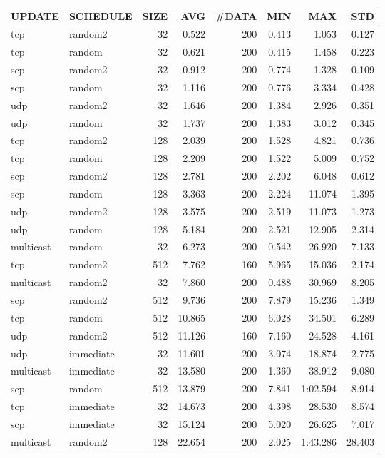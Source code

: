 \begin{tabular}{|l|l|r|r|r|r|r|r|}
\hline
UPDATE & SCHEDULE & SIZE & AVG & \#DATA & MIN & MAX & STD\\
\hline
tcp & random2 & 32 & 0.522 & 200 & 0.413 & 1.053 & 0.127\\
tcp & random & 32 & 0.621 & 200 & 0.415 & 1.458 & 0.223\\
scp & random2 & 32 & 0.912 & 200 & 0.774 & 1.328 & 0.109\\
scp & random & 32 & 1.116 & 200 & 0.776 & 3.334 & 0.428\\
udp & random2 & 32 & 1.646 & 200 & 1.384 & 2.926 & 0.351\\
udp & random & 32 & 1.737 & 200 & 1.383 & 3.012 & 0.345\\
tcp & random2 & 128 & 2.039 & 200 & 1.528 & 4.821 & 0.736\\
tcp & random & 128 & 2.209 & 200 & 1.522 & 5.009 & 0.752\\
scp & random2 & 128 & 2.781 & 200 & 2.202 & 6.048 & 0.612\\
scp & random & 128 & 3.363 & 200 & 2.224 & 11.074 & 1.395\\
udp & random2 & 128 & 3.575 & 200 & 2.519 & 11.073 & 1.273\\
udp & random & 128 & 5.184 & 200 & 2.521 & 12.905 & 2.314\\
multicast & random & 32 & 6.273 & 200 & 0.542 & 26.920 & 7.133\\
tcp & random2 & 512 & 7.762 & 160 & 5.965 & 15.036 & 2.174\\
multicast & random2 & 32 & 7.860 & 200 & 0.488 & 30.969 & 8.205\\
scp & random2 & 512 & 9.736 & 200 & 7.879 & 15.236 & 1.349\\
tcp & random & 512 & 10.865 & 200 & 6.028 & 34.501 & 6.289\\
udp & random2 & 512 & 11.126 & 160 & 7.160 & 24.528 & 4.161\\
udp & immediate & 32 & 11.601 & 200 & 3.074 & 18.874 & 2.775\\
multicast & immediate & 32 & 13.580 & 200 & 1.360 & 38.912 & 9.080\\
scp & random & 512 & 13.879 & 200 & 7.841 & 1:02.594 & 8.914\\
tcp & immediate & 32 & 14.673 & 200 & 4.398 & 28.530 & 8.574\\
scp & immediate & 32 & 15.124 & 200 & 5.020 & 26.625 & 7.017\\
multicast & random2 & 128 & 22.654 & 200 & 2.025 & 1:43.286 & 28.403\\

\end{tabular}
